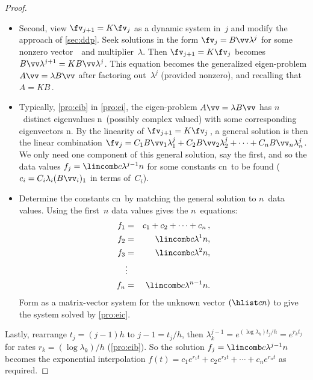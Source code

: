 \begin{reduce}
\begin{proof}
\begin{itemize}
\item Second, view \(\fv_{j+1}=K\fv_j\) as a dynamic system in~\(j\) and modify the approach of \autoref{sec:ddp}.
Seek solutions in the form \(\fv_j=B\vv \lambda^j\) for some nonzero vector~\vv\ and multiplier~\(\lambda\).
Then \(\fv_{j+1}=K\fv_j\) becomes \(B\vv \lambda^{j+1}=KB\vv \lambda^j\).
This equation becomes the generalized eigen-problem \(A\vv=\lambda B\vv\) after factoring out~\(\lambda^j\) (provided nonzero), and recalling that \(A=KB\)\,.

\item Typically, \autoref{pro:eib} in \autoref{pro:ei}, the eigen-problem \(A\vv=\lambda B\vv\) has \(n\)~distinct eigenvalues \hlist\lambda n\ (possibly complex valued) with some corresponding eigenvectors \hlist\vv n.
By the linearity of \(\fv_{j+1}=K\fv_j\)\,, a general solution is then the linear combination \(\fv_j=C_1B\vv_1\lambda_1^{j} +C_2B\vv_2\lambda_2^{j} +\cdots +C_nB\vv_n\lambda_n^{j}\).
We only need one component of this general solution, say the first, and so the data values \(f_j=\lincomb c{\lambda^{j-1}}n\) for some constants \hlist cn\ to be found (\(c_i=C_i\lambda_i(B\vv_i)_1\) in terms of~\(C_i\)).

\item Determine the constants \hlist cn\ by matching the general solution to \(n\)~data values.
Using the first~\(n\) data values gives the \(n\)~equations:
\begin{eqnarray*}
f_1&=&c_1+c_2+\cdots+c_n\,,
\\f_2&=&\lincomb c{\lambda^{1}}n,
\\f_3&=&\lincomb c{\lambda^{2}}n,
\\&\vdots&
\\f_n&=&\lincomb c{\lambda^{n-1}}n.
\end{eqnarray*}
Form as a matrix-vector system for the unknown vector \((\hlist cn)\) to give the system solved by \autoref{pro:eic}.
\end{itemize}
Lastly, rearrange \(t_j=(j-1)h\) to \(j-1=t_j/h\), then \(\lambda_k^{j-1}=e^{(\log \lambda_k)t_j/h}=e^{r_kt_j}\) for rates \(r_k=(\log\lambda_k)/h\) (\autoref{pro:eib}).
So the solution \(f_j=\lincomb c{\lambda^{j-1}}n\) becomes the exponential interpolation \(f(t)=c_1e^{r_1t}+c_2e^{r_2t}+\cdots+c_ne^{r_nt}\) as required.
\end{proof}






\end{reduce}
